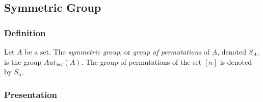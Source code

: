 \subsection{Symmetric Group}\label{symmetricgroup}

\subsubsection{Definition}
Let $A$ be a set. The \emph{symmetric group}, or \emph{group of permutations} of $A$, denoted $S_A$, is the group
$Aut_{Set}(A)$. The group of permutations of the set $[n]$ is denoted by $S_n$.

\subsubsection{Presentation}